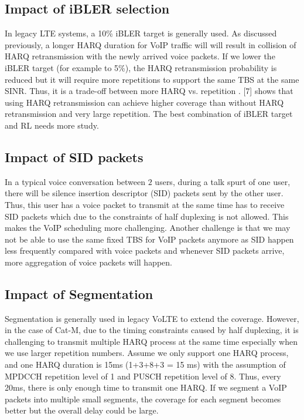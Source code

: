 \documentclass[conference,compsoc]{IEEEtran}
\begin{document}
\subsection{Impact of iBLER selection}
In legacy LTE systems, a 10\% iBLER target is generally used. As discussed previously, a longer HARQ duration for VoIP traffic will will result in collision of HARQ retransmission with the newly arrived voice packets. If we lower the iBLER target (for example to 5\%), the HARQ retransmission probability is reduced but it will require more repetitions to support the same TBS at the same SINR. Thus, it is a trade-off between more HARQ vs. repetition  . [7] shows that using HARQ retransmission can achieve higher coverage than without HARQ retransmission and very large repetition. The best combination of iBLER target and RL needs more study.

\subsection{Impact of SID packets}
In a typical voice conversation between $2$ users, during a talk spurt of one user, there will be silence insertion descriptor (SID) packets sent by the other user. Thus, this user has a voice packet to transmit at the same time has to receive SID packets which due to the constraints of half duplexing is not allowed. This makes the VoIP scheduling more challenging. Another challenge is that we may not be able to use the same fixed TBS for VoIP packets anymore as SID happen less frequently compared with voice packets and whenever SID packets arrive, more aggregation of voice packets will happen.

\subsection{Impact of Segmentation}
Segmentation is generally used in legacy VoLTE to extend the coverage. However, in the case of Cat-M, due to the timing constraints caused by half duplexing, it is challenging to transmit multiple HARQ process at the same time especially when we use larger repetition numbers. Assume we only support one HARQ process, and one HARQ duration is 15ms (1+3+8+3 = 15 ms) with the assumption of MPDCCH repetition level of 1 and PUSCH repetition level of 8. Thus, every 20ms, there is only enough time to transmit one HARQ. If we segment a VoIP packets into multiple small segments, the coverage for each segment becomes better but the overall delay could be large.
\end{document}
